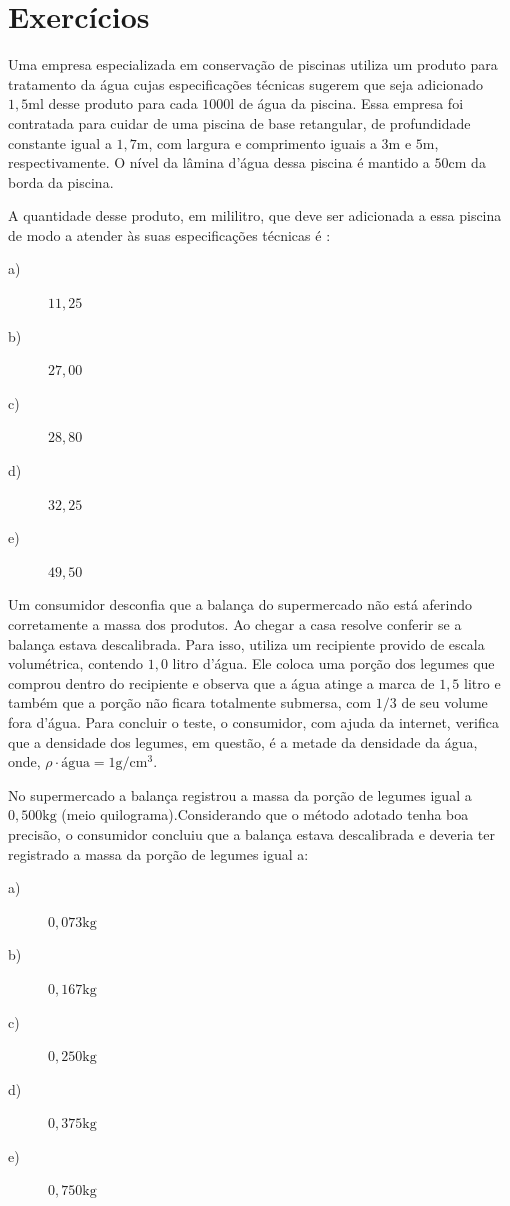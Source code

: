 \section{Exercícios}

\begin{exercise}[ENEM 2017]
	Uma empresa especializada em conservação de piscinas utiliza um produto para tratamento da água cujas especificações técnicas sugerem que seja adicionado $1,5 \mathrm{ml}$ desse produto para cada $1000 \mathrm{l}$ de água da piscina. Essa empresa foi contratada para cuidar de uma piscina de base retangular, de profundidade constante igual a $1,7 \mathrm{m}$, com largura e comprimento iguais a $\mathrm{3m}$ e $5 \mathrm{m}$, respectivamente. O nível da lâmina d’água dessa piscina é mantido a $50 \mathrm{cm}$ da borda da piscina.

A quantidade desse produto, em mililitro, que deve ser adicionada a essa piscina de modo a atender às suas especificações técnicas é :
    \begin{description}
        \item[a)] $11,25$
        \item[b)] $27,00$
        \item[c)] $28,80$
        \item[d)] $32,25$
        \item[e)] $49,50$
    \end{description}
\end{exercise}

\begin{exercise}[ENEM 2010]
Um consumidor desconfia que a balança do supermercado não está aferindo corretamente a massa dos produtos. Ao chegar a casa resolve conferir se a balança estava descalibrada. Para isso, utiliza um recipiente provido de escala volumétrica, contendo $1,0$ litro d’água. Ele coloca uma porção dos legumes que comprou dentro do recipiente e observa que a água atinge a marca de $1,5$ litro e também que a porção não ficara totalmente submersa, com $1/3$ de seu volume fora d’água. Para concluir o teste, o consumidor, com ajuda da internet, verifica que a  densidade dos legumes, em questão, é a metade da densidade da água, onde, $ \rho \cdot \textrm{água} = 1 \mathrm{g/cm^{3}}$.

No supermercado a balança registrou a massa da porção de legumes igual a $0,500 \mathrm{kg}$ (meio quilograma).Considerando que o método adotado tenha boa precisão, o consumidor concluiu que a balança estava descalibrada e deveria ter registrado a massa da porção de legumes igual a:

    \begin{description}
        \item[a)] $0,073 \mathrm{ kg}$
        \item[b)] $0,167 \mathrm{ kg}$
        \item[c)] $0,250 \mathrm{ kg}$
        \item[d)] $0,375 \mathrm{ kg}$
        \item[e)] $0,750 \mathrm{ kg}$
    \end{description}
\end{exercise}

